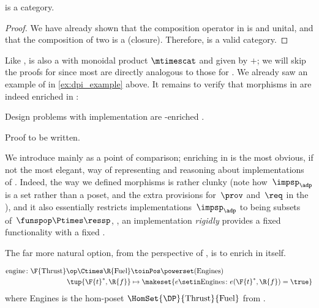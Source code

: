 \begin{lemma}
    \label{lem:DPI-is-category}
    \DPI is a category.
\end{lemma}

\begin{proof}
    We have already shown that the composition operator in \DPI is  and unital, and that the composition of two  is a  (closure).
    Therefore, \DPI is a valid category.
\end{proof}

Like \DP, \DPI is also a  with monoidal product $\mtimescat$ and  given by $+$;
we will skip the proofs for \DPI since most are directly analogous to those for \DP.
We already saw an example of \DPI in \cref{ex:dpi_example} above.
It remains to verify that morphisms in \DPI are indeed enriched in \Set:

\begin{proposition}
    Design problems with implementation are \Set-enriched .
\end{proposition}
\begin{publictodo}
    Proof to be written.
\end{publictodo}
We introduce \DPI mainly as a point of comparison; enriching in \Set is the most obvious, if not the most elegant, way of representing and reasoning about implementations of .
Indeed, the way we defined morphisms is rather clunky (note how~$\impsp_\adp$ is a set rather than a poset, and the extra provisions for~$\prov$ and~$\req$ in the ), and it also essentially restricts implementations~$\impsp_\adp$ to being subsets of~$\funspop \Ptimes \ressp$, \ie, an implementation \emph{rigidly} provides a fixed functionality \fun with a fixed \res.

The far more natural option, from the perspective of  , is to enrich  in \DP itself.

\begin{example}
    \begin{equation}
        \begin{aligned}
            \text{engine} \colon \F{\text{Thrust}}\op \Ctimes \R{\text{Fuel}} & \toinPos \powerset(\text{Engines}) \\
            \tup{\F{t}^*,\R{f}}                                               & \mapsto \makeset{ e \setin \text{Engines} \colon e(\F{t}^*, \R{f}) = \true }
        \end{aligned}
    \end{equation}
    where Engines is the hom-poset $\HomSet{\DP}{\text{Thrust}}{\text{Fuel}}$ from \XXX. %
\end{example}

